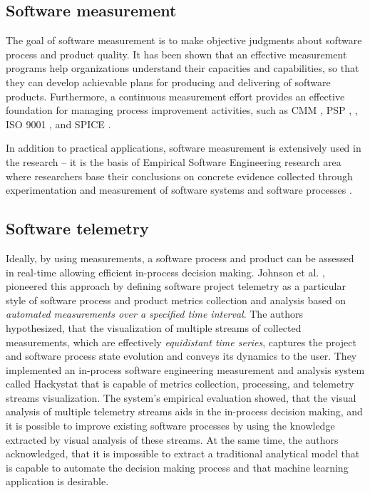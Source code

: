 \subsection{Software measurement}
The goal of software measurement is to make objective judgments about software process and product quality. 
It has been shown that an effective measurement programs help organizations understand their capacities and 
capabilities, so that they can develop achievable plans for producing and delivering of software products. 
Furthermore, a continuous measurement effort provides an effective foundation for managing process 
improvement activities, 
such as CMM \cite{citeulike:9962021}, 
PSP \cite{citeulike:8347315}, \cite{citeulike:5090131} \cite{citeulike:12929216}, 
ISO 9001 \cite{iso-standard}, and SPICE \cite{spice-standard}.

In addition to practical applications, software measurement is extensively used in the research --
it is the basis of Empirical Software Engineering research area where researchers base their conclusions on 
concrete evidence collected through experimentation and measurement of software systems and software 
processes \cite{citeulike:766768}.

\subsection{Software telemetry}\label{section_software_telemetry}
Ideally, by using measurements, a software process and product can be assessed in real-time allowing efficient 
in-process decision making.
Johnson et al. \cite{citeulike:557296}, pioneered this approach by defining software project telemetry as a 
particular style of software process and product metrics collection and analysis based on 
\textit{automated measurements over a specified time interval}. 
The authors hypothesized, that the visualization of multiple streams of collected measurements, 
which are effectively \textit{equidistant time series}, captures the project and software 
process state evolution and conveys its dynamics to the user.
They implemented an in-process software engineering measurement and analysis system called Hackystat 
\cite{citeulike:12929227} that is capable of metrics collection, processing, and telemetry streams visualization. 
The system's empirical evaluation showed, that the visual analysis of multiple telemetry streams aids 
in the in-process decision making, and it is possible to improve existing software processes by using 
the knowledge extracted by visual analysis of these streams. 
At the same time, the authors acknowledged, that it is impossible to extract a traditional analytical 
model that is capable to automate the decision making process and that machine learning application is 
desirable.

